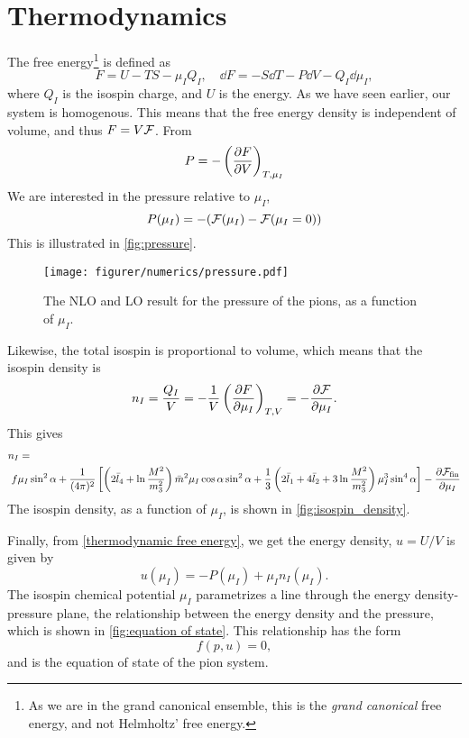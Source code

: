 \section{Thermodynamics}
The free energy\footnote{As we are in the grand canonical ensemble, this is the \emph{grand canonical} free energy, and not Helmholtz' free energy.}
is defined as
\begin{equation}
    \label{thermodynamic free energy}
    F = U - TS - \mu_I Q_I, \quad \dd F = - S \dd T - P \dd V - Q_I \dd \mu_I ,
\end{equation}
where $Q_I$ is the isospin charge, and $U$ is the energy.
As we have seen earlier, our system is homogenous.
This means that the free energy density is independent of volume, and thus $F = V \mathcal{F}$.
From 
\begin{equation}
    P = - \left(\diffp{F}{V}\right)_{T, \mu_I}
\end{equation}
We are interested in the pressure relative to $\mu_I$, 
\begin{equation}
    P(\mu_I) = -(\mathcal{F}(\mu_I) - \mathcal{F}(\mu_I = 0))
\end{equation}
This is illustrated in \autoref{fig:pressure}.
\begin{figure}[h]
    \centering
    \vspace{-0.2cm}
    \texttt{[image: figurer/numerics/pressure.pdf]}
    \caption{The NLO and LO result for the pressure of the pions, as a function of $\mu_I$.}
    \label{fig:pressure}
\end{figure}

Likewise, the total isospin is proportional to volume, which means that the isospin density is
\begin{equation}
    n_I = \frac{Q_I}{V} = - \frac{1}{V} \left(\diffp{F}{\mu_I}\right)_{T, V}
    = - \diffp{\Ef}{\mu_I}.
\end{equation}
This gives 
\begin{align}
    \nonumber
    &n_I = \\ & \,\, f \mu_I \sin^2 \alpha
    + \frac{1}{(4 \pi)^2}
    \left[
            \left(2\bar l_4+\ln\frac{M^2}{m_3^2}\right)\bar m^2 \mu_I \cos\alpha \sin^2 \alpha
            +\frac{1}{3}\left(2\bar l_1 + 4 \bar l_2 + 3\ln\frac{M^2}{m_3^2}\right)\mu_I^3 \sin^4 \alpha
    \right]
    - \diffp{\Ef_\mathrm{fin}}{\mu_I}
\end{align}
The isospin density, as a function of $\mu_I$, is shown in \autoref{fig:isospin_density}.

Finally, from \cref{thermodynamic free energy}, we get the energy density, $u = U/V$ is given by
\begin{equation}
    u(\mu_I) = -P(\mu_I) + \mu_I n_I(\mu_I).
\end{equation}
The isospin chemical potential $\mu_I$ parametrizes a line through the energy density-pressure plane, the relationship between the energy density and the pressure, which is shown in \autoref{fig:equation of state}.
This relationship has the form
\begin{equation}
    f(p, u) = 0,
\end{equation}
and is the equation of state of the pion system.


